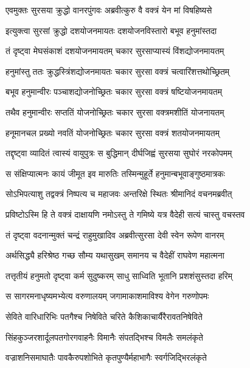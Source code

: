 \twolineshloka
{एवमुक्तः सुरसया क्रुद्धो वानरपुंगवः}
{अब्रवीत्कुरु वै वक्त्रं येन मां विषहिष्यसे} %

\twolineshloka
{इत्युक्त्वा सुरसां क्रुद्धो दशयोजनमायतः}
{दशयोजनविस्तारो बभूव हनुमांस्तदा} %

\twolineshloka
{तं दृष्ट्वा मेघसंकाशं दशयोजनमायतम्}
{चकार सुरसाप्यास्यं विंशद्योजनमायतम्} %

\twolineshloka
{हनुमांस्तु ततः क्रुद्धस्त्रिंशद्योजनमायतः}
{चकार सुरसा वक्त्रं चत्वारिंशत्तथोच्छ्रितम्} %

\twolineshloka
{बभूव हनुमान्वीरः पञ्चाशद्योजनोच्छ्रितः}
{चकार सुरसा वक्त्रं षष्टियोजनमायतम्} %

\twolineshloka
{तथैव हनुमान्वीरः सप्ततिं योजनोच्छ्रितः}
{चकार सुरसा वक्त्रमशीतिं योजनायतम्} %

\twolineshloka
{हनूमानचल प्रख्यो नवतिं योजनोच्छ्रितः}
{चकार सुरसा वक्त्रं शतयोजनमायतम्} %

\twolineshloka
{तद्दृष्ट्वा व्यादितं त्वास्यं वायुपुत्रः स बुद्धिमान्}
{दीर्घजिह्वं सुरसया सुघोरं नरकोपमम्} %

\twolineshloka
{स संक्षिप्यात्मनः कायं जीमूत इव मारुतिः}
{तस्मिन्मुहूर्ते हनुमान्बभूवाङ्गुष्ठमात्रकः} %

\twolineshloka
{सोऽभिपत्याशु तद्वक्त्रं निष्पत्य च महाजवः}
{अन्तरिक्षे स्थितः श्रीमानिदं वचनमब्रवीत्} %

\twolineshloka
{प्रविष्टोऽस्मि हि ते वक्त्रं दाक्षायणि नमोऽस्तु ते}
{गमिष्ये यत्र वैदेही सत्यं चास्तु वचस्तव} %

\twolineshloka
{तं दृष्ट्वा वदनान्मुक्तं चन्द्रं राहुमुखादिव}
{अब्रवीत्सुरसा देवी स्वेन रूपेण वानरम्} %

\twolineshloka
{अर्थसिद्ध्यै हरिश्रेष्ठ गच्छ सौम्य यथासुखम्}
{समानय च वैदेहीं राघवेण महात्मना} %

\twolineshloka
{तत्तृतीयं हनुमतो दृष्ट्वा कर्म सुदुष्करम्}
{साधु साध्विति भूतानि प्रशशंसुस्तदा हरिम्} %

\twolineshloka
{स सागरमनाधृष्यमभ्येत्य वरुणालयम्}
{जगामाकाशमाविश्य वेगेन गरुणोपमः} %

\twolineshloka
{सेविते वारिधारिभिः पतगैश्च निषेविते}
{चरिते कैशिकाचार्यैरैरावतनिषेविते} %

\twolineshloka
{सिंहकुञ्जरशार्दूलपतगोरगवाहनैः}
{विमानैः संपतद्भिश्च विमलैः समलंकृते} %

\twolineshloka
{वज्राशनिसमाघातैः पावकैरुपशोभिते}
{कृतपुण्यैर्महाभागैः स्वर्गजिद्भिरलंकृते} %

